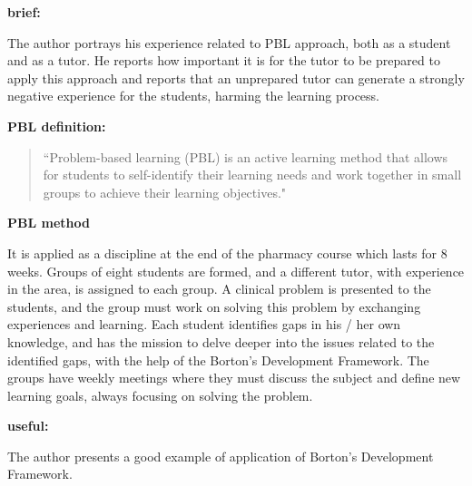 \documentclass[class=article, crop=false]{standalone}
\begin{document}
\begin{adjustwidth}{-60pt}{-30pt}
\begin{singlespace}


\begin{minipage}{\textwidth}

\begin{pabox}[label={myusecounter}]{\hfill  \cite{Fernandes2021}}

\textbf{brief:}
\vspace{5pt}

The author portrays his experience related to PBL approach, both as a student and as a tutor. He reports how important it is for the tutor to be prepared to apply this approach and reports that an unprepared tutor can generate a strongly negative experience for the students, harming the learning process.
\vspace{5pt}

\textbf{PBL definition:}

\begin{quote}
 ``Problem-based learning (PBL) is an active learning method that allows for students to self-identify their learning needs and work together in small groups to achieve their learning objectives."
\end{quote} 

\textbf{PBL method}
\vspace{5pt}

It is applied as a discipline at the end of the pharmacy course which lasts for 8 weeks. Groups of eight students are formed, and a different tutor, with experience in the area, is assigned to each group. A clinical problem is presented to the students, and the group must work on solving this problem by exchanging experiences and learning. Each student identifies gaps in his / her own knowledge, and has the mission to delve deeper into the issues related to the identified gaps, with the help of the Borton’s Development Framework. The groups have weekly meetings where they must discuss the subject and define new learning goals, always focusing on solving the problem.
\vspace{5pt}

\textbf{useful:}
\vspace{5pt}

The author presents a good example of application of Borton’s Development Framework.

\tcblower




\end{pabox}
\end{minipage}

\end{singlespace}
\end{adjustwidth}
\end{document}
